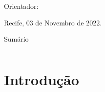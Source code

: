 \documentclass[professionalfont]{beamer}
\begin{document}
\begin{frame}
    \begin{minipage}{\textwidth}
        \begin{tcolorbox}[halign=center,
    valign=center,colupper=black,boxsep=1pt,width=\textwidth,colback={white},colbacktitle=yellow]    
            \Large \titulo
        \end{tcolorbox}
    \end{minipage}
    
    \vspace{0.3cm}
    
    \begin{minipage}{\textwidth}
        \autor
        
        Orientador: \orientador
    \end{minipage}
    
    \vfill
        
    Recife, 03 de Novembro de 2022.
    
    
    
    
\end{frame}

\begin{frame}{Sumário}
\begin{columns}[t]
        \begin{column}{.4\textwidth}
            \tableofcontents[sections={1-3}]
        \end{column}
        \begin{column}{.4\textwidth}
            \tableofcontents[sections={4-6}]
        \end{column}
    \end{columns}
\end{frame}

\section{Introdução}
\end{document}
